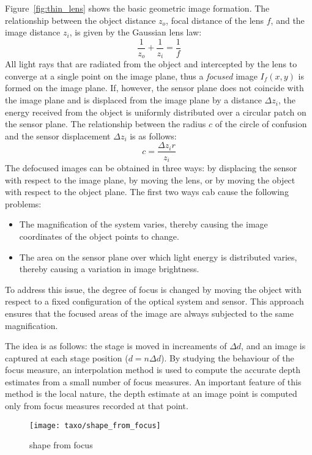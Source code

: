 Figure~\ref{fig:thin_lens} shows the basic geometric image formation. The relationship between the object distance $z_o$, focal distance of the lens $f$, and the image distance $z_i$, is given by the Gaussian lens law:
$$
\frac{1}{z_o}+\frac{1}{z_i}=\frac{1}{f}
$$
All light rays that are radiated from the object and intercepted by the lens to converge at a single point on the image plane, thus a \textit{focused} image $I_f(x, y)$ is formed on the image plane. If, however, the sensor plane does not coincide with the image plane and is displaced from the image plane by a distance $\Delta z_i$, the energy received from the object is uniformly distributed over a circular patch on the sensor plane. The relationship between the radius $c$ of the circle of confusion and the sensor displacement $\Delta z_i$ is as follows:
$$
c = \frac{\Delta z_i r}{z_i}
$$
The defocused images can be obtained in three ways: by displacing the sensor with respect to the image plane, by moving the lens, or by moving the object with respect to the object plane. The first two ways cab cause the following problems:
\begin{itemize}
\item The magnification of the system varies, thereby causing the image coordinates of the object points to change.
\item The area on the sensor plane over which light energy is distributed varies, thereby causing a variation in image brightness.
\end{itemize}
To address this issue, the degree of focus is changed by moving the object with respect to a fixed configuration of the optical system and sensor. This approach ensures that the focused areas of the image are always subjected to the same magnification.

The idea is as follows: the stage is moved in increaments of $\Delta d$, and an image is captured at each stage position ($d=n\Delta d$). By studying the behaviour of the focus measure, an interpolation method is used to compute the accurate depth estimates from a small number of focus measures. An important feature of this method is the local nature, the depth estimate at an image point is computed only from focus measures recorded at that point.
\begin{figure}[h]
\centering
\texttt{[image: taxo/shape\_from\_focus]}
\caption{shape from focus}
\label{fig:shape_from_focus}
\end{figure}

